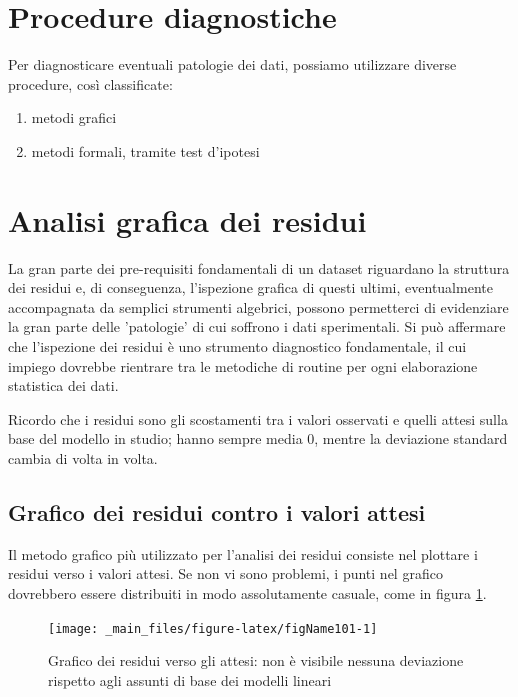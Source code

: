 \documentclass[a4paper,12pt,oneside]{book}
\providecommand{\tightlist}{%
  \setlength{\itemsep}{0pt}\setlength{\parskip}{0pt}}
\begin{document}
\hypertarget{procedure-diagnostiche}{%
\section{Procedure diagnostiche}\label{procedure-diagnostiche}}

Per diagnosticare eventuali patologie dei dati, possiamo utilizzare diverse procedure, così classificate:

\begin{enumerate}
\def\labelenumi{\arabic{enumi}.}
\tightlist
\item
  metodi grafici
\item
  metodi formali, tramite test d'ipotesi
\end{enumerate}

\hypertarget{analisi-grafica-dei-residui}{%
\section{Analisi grafica dei residui}\label{analisi-grafica-dei-residui}}

La gran parte dei pre-requisiti fondamentali di un dataset riguardano la struttura dei residui e, di conseguenza, l'ispezione grafica di questi ultimi, eventualmente accompagnata da semplici strumenti algebrici, possono permetterci di evidenziare la gran parte delle 'patologie' di cui soffrono i dati sperimentali. Si può affermare che l'ispezione dei residui è uno strumento diagnostico fondamentale, il cui impiego dovrebbe rientrare tra le metodiche di routine per ogni elaborazione statistica dei dati.

Ricordo che i residui sono gli scostamenti tra i valori osservati e quelli attesi sulla base del modello in studio; hanno sempre media 0, mentre la deviazione standard cambia di volta in volta.

\hypertarget{grafico-dei-residui-contro-i-valori-attesi}{%
\subsection{Grafico dei residui contro i valori attesi}\label{grafico-dei-residui-contro-i-valori-attesi}}

Il metodo grafico più utilizzato per l'analisi dei residui consiste nel plottare i residui verso i valori attesi. Se non vi sono problemi, i punti nel grafico dovrebbero essere distribuiti in modo assolutamente casuale, come in figura \ref{fig:figName101}.

\begin{figure}

{\centering \texttt{[image: \_main\_files/figure-latex/figName101-1]} 

}

\caption{Grafico dei residui verso gli attesi: non è visibile nessuna deviazione rispetto agli assunti di base dei modelli lineari}\label{fig:figName101}
\end{figure}
\end{document}

